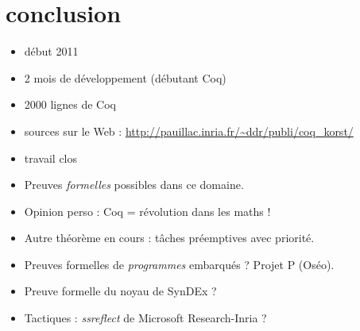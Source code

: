\documentclass[t]{beamer}
\begin{document}
\section{conclusion}

 {

  \begin{itemize}
  \item début 2011
  \item 2 mois de développement (débutant Coq)
  \item 2000 lignes de Coq
  \item sources sur le Web :
    \url{http://pauillac.inria.fr/~ddr/publi/coq_korst/}
  \item travail clos
  \end{itemize}
  
}

 {

  \begin{itemize}
  \item Preuves {\em formelles} possibles dans ce domaine.
  \item Opinion perso : Coq = révolution dans les maths !
  \item Autre théorème en cours : tâches préemptives avec priorité.
  \item Preuves formelles de {\em programmes} embarqués ? Projet P (Oséo).
  \item Preuve formelle du noyau de SynDEx ?
  \item Tactiques : {\em ssreflect} de Microsoft Research-Inria ?
  \end{itemize}

}
\end{document}
